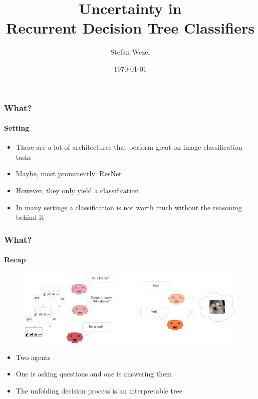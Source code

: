 \documentclass[9pt]{beamer}
\title{Uncertainty in\\Recurrent Decision Tree Classifiers}
\author{Stefan Wezel}
\institute{Explainable Machine Learning}
\date{\today}
\begin{document}
\begin{frame}[plain]
	\titlepage
\end{frame} 

\begin{frame}
\frametitle{What?}
\framesubtitle{Setting}
	\begin{itemize}\setlength\itemsep{1em}
	\item There are a lot of architectures that perform great on image classification tasks
	\item Maybe, most prominently: ResNet
	\item However, they only yield a classification
	\item In many settings a classification is not worth much without the reasoning behind it
	\end{itemize}
\end{frame} 


\begin{frame}
\frametitle{What?}
\framesubtitle{Recap}
	\begin{figure}
	\centering
	\includegraphics[width=1\textwidth]{images/rdtc_intuition.pdf}
\end{figure}
\begin{itemize}\setlength\itemsep{1em}
	\item Two agents
	\item One is asking questions and one is answering them
	\item The unfolding decision process is an interpretable tree
\end{itemize}
\end{frame} 
\end{document}
